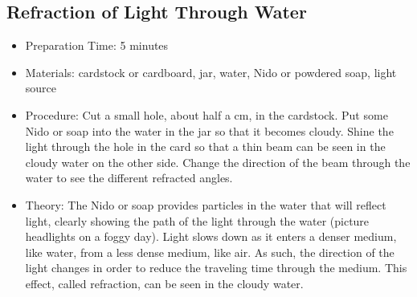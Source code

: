 
\subsection{Refraction of Light Through Water}
\begin{itemize}
\item{Preparation Time: 5 minutes}
\item{Materials: cardstock or cardboard, jar, water, Nido or powdered soap, light source}
\item{Procedure: Cut a small hole, about half a cm, in the cardstock. Put some Nido or soap into the water in the jar so that it becomes cloudy. Shine the light through the hole in the card so that a thin beam can be seen in the cloudy water on the other side. Change the direction of the beam through the water to see the different refracted angles.}
\item{Theory: The Nido or soap provides particles in the water that will reflect light, clearly showing the path of the light through the water (picture headlights on a foggy day). Light slows down as it enters a denser medium, like water, from a less dense medium, like air. As such, the direction of the light changes in order to reduce the traveling time through the medium. This effect, called refraction, can be seen in the cloudy water.}
\end{itemize}



